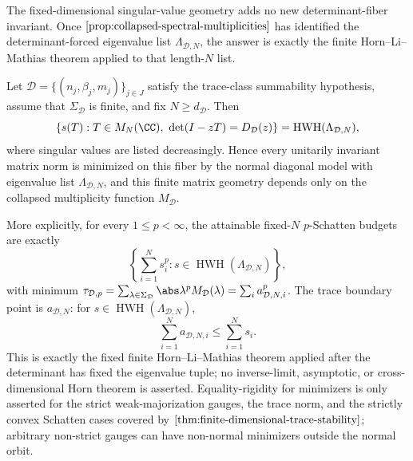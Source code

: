 The fixed-dimensional singular-value geometry adds no new determinant-fiber
invariant.  Once \(\Cref{prop:collapsed-spectral-multiplicities}\) has
identified the determinant-forced eigenvalue list \(\Lambda_{\mathcal D,N}\),
the answer is exactly the finite Horn--Li--Mathias theorem applied to that
length-\(N\) list.

\begin{corollary}
  \label{cor:fixed-dimensional-weyl-horn-image}
  \label{def:finite-weyl-horn-body}
  \label{lem:zero-inclusive-finite-horn-theorem}
  \label{lem:zero-inclusive-log-majorization-fan-dominance}
  \label{thm:finite-dimensional-weyl-horn-cyclic-determinant-fiber}
  \label{prop:finite-horn-subordinate-trace-chain}
  \label{cor:universal-finite-dimensional-symmetric-gauge-minimization}
  \label{prop:strict-weak-majorization-gauge-rigidity}
  \label{cor:finite-dimensional-gauge-minimizer-taxonomy}
  \label{prop:arbitrary-gauge-taxonomy-sharpness}
  \label{cor:exact-fixed-dimensional-schatten-budget-range}
  \label{cor:horn-boundary-trace-stability}
  Let \(\mathcal D=\{(n_j,\beta_j,m_j)\}_{j\in J}\) satisfy the trace-class
  summability hypothesis, assume that \(\Sigma_{\mathcal D}\) is finite, and
  fix \(N\ge d_{\mathcal D}\).  Then
  \[
    \{s(T):T\in M_N(\CC),\ \det(I-zT)=D_{\mathcal D}(z)\}
    =\operatorname{HWH}(\Lambda_{\mathcal D,N}),
  \]
  where singular values are listed decreasingly.  Hence every unitarily
  invariant matrix norm is minimized on this fiber by the normal diagonal model
  with eigenvalue list \(\Lambda_{\mathcal D,N}\), and this finite matrix
  geometry depends only on the collapsed multiplicity function
  \(M_{\mathcal D}\).

  More explicitly, for every \(1\le p<\infty\), the attainable fixed-\(N\)
  \(p\)-Schatten budgets are exactly
  \[
    \left\{
      \sum_{i=1}^N s_i^p:
      s\in\operatorname{HWH}(\Lambda_{\mathcal D,N})
    \right\},
  \]
  with minimum
  \(\tau_{\mathcal D,p}=\sum_{\lambda\in\Sigma_{\mathcal D}}
  \abs\lambda^pM_{\mathcal D}(\lambda)=\sum_i a_{\mathcal D,N,i}^p\).  The
  trace boundary point is \(a_{\mathcal D,N}\): for
  \(s\in\operatorname{HWH}(\Lambda_{\mathcal D,N})\),
  \[
    \sum_{i=1}^N a_{\mathcal D,N,i}\le\sum_{i=1}^Ns_i.
  \]
  This is exactly the fixed finite Horn--Li--Mathias theorem applied after the
  determinant has fixed the eigenvalue tuple; no inverse-limit, asymptotic, or
  cross-dimensional Horn theorem is asserted. Equality-rigidity for minimizers
  is only asserted for the strict weak-majorization gauges, the trace norm, and
  the strictly convex Schatten cases covered by
  \(\Cref{thm:finite-dimensional-trace-stability}\); arbitrary non-strict gauges
  can have non-normal minimizers outside the normal orbit.
\end{corollary}

